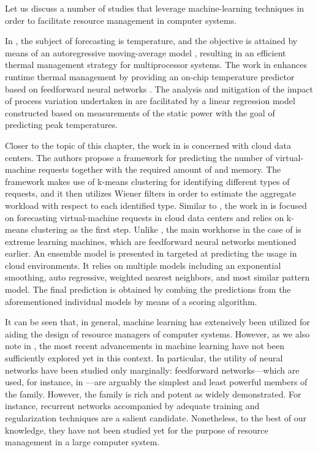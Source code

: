 Let us discuss a number of studies that leverage machine-learning techniques in
order to facilitate resource management in computer systems.

In \cite{coskun2008}, the subject of forecasting is temperature, and the
objective is attained by means of an autoregressive moving-average model
\cite{hastie2013}, resulting in an efficient thermal management strategy for
multiprocessor systems. The work in \cite{kumar2010} enhances runtime thermal
management by providing an on-chip temperature predictor based on feedforward
neural networks \cite{hastie2013}. The analysis and mitigation of the impact of
process variation undertaken in \cite{juan2014} are facilitated by a linear
regression model \cite{hastie2013} constructed based on measurements of the
static power with the goal of predicting peak temperatures.

Closer to the topic of this chapter, the work in \cite{dabbagh2015} is concerned
with cloud data centers. The authors propose a framework for predicting the
number of virtual-machine requests together with the required amount of 
and memory. The framework makes use of k-means clustering \cite{hastie2013} for
identifying different types of requests, and it then utilizes Wiener filters in
order to estimate the aggregate workload with respect to each identified type.
Similar to \cite{dabbagh2015}, the work in \cite{ismaeel2015} is focused on
forecasting virtual-machine requests in cloud data centers and relies on k-means
clustering as the first step. Unlike \cite{dabbagh2015}, the main workhorse in
the case of \cite{ismaeel2015} is extreme learning machines, which are
feedforward neural networks mentioned earlier. An ensemble model
\cite{hastie2013} is presented in \cite{cao2014} targeted at predicting the
 usage in cloud environments. It relies on multiple models including an
exponential smoothing, auto regressive, weighted nearest neighbors, and most
similar pattern model. The final prediction is obtained by combing the
predictions from the aforementioned individual models by means of a scoring
algorithm.

It can be seen that, in general, machine learning has extensively been utilized
for aiding the design of resource managers of computer systems. However, as we
also note in , the most recent advancements in machine
learning have not been sufficiently explored yet in this context. In particular,
the utility of neural networks have been studied only marginally: feedforward
networks---which are used, for instance, in \cite{kumar2010, ismaeel2015}---are
arguably the simplest and least powerful members of the family. However, the
family is rich and potent as widely demonstrated. For instance, recurrent
networks accompanied by adequate training and regularization techniques
\cite{goodfellow2016} are a salient candidate. Nonetheless, to the best of our
knowledge, they have not been studied yet for the purpose of resource management
in a large computer system.

